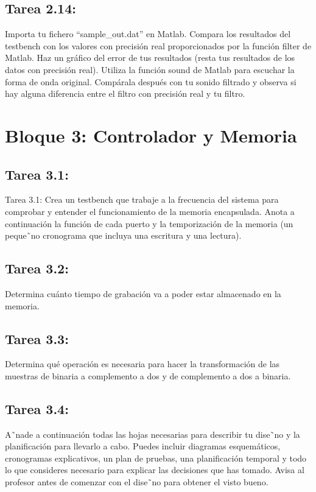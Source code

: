 \documentclass{article}
\begin{document}
\subsection{Tarea 2.14:}
Importa tu fichero ``sample{\_}out.dat'' en Matlab. Compara los resultados del testbench con los valores con precisión real proporcionados por la función filter de Matlab. Haz un gráfico del error de tus resultados (resta tus resultados de los datos con precisión real).
Utiliza la función sound de Matlab para escuchar la forma de onda original. Compárala después con tu sonido filtrado y observa si hay alguna diferencia entre el filtro con precisión real y tu filtro.

\section{Bloque 3: Controlador y Memoria}

\subsection{Tarea 3.1:}
Tarea 3.1:
Crea un testbench que trabaje a la frecuencia del sistema para comprobar y entender el funcionamiento de la memoria encapsulada. Anota a continuación la función de cada
puerto y la temporización de la memoria (un peque˜no cronograma que incluya una escritura y una lectura).

\subsection{Tarea 3.2:}

Determina cuánto tiempo de grabación va a poder estar almacenado en la memoria.

\subsection{Tarea 3.3:}
Determina qué operación es necesaria para hacer la transformación de las muestras de binaria a complemento a dos y de complemento a dos a binaria.

\subsection{Tarea 3.4:}
A˜nade a continuación todas las hojas necesarias para describir tu dise˜no y la planificación para llevarlo a cabo. Puedes incluir diagramas esquemáticos, cronogramas explicativos, un plan de pruebas, una planificación temporal y todo lo que consideres necesario para explicar las decisiones que has tomado.
Avisa al profesor antes de comenzar con el dise˜no para obtener el visto bueno.
\end{document}
